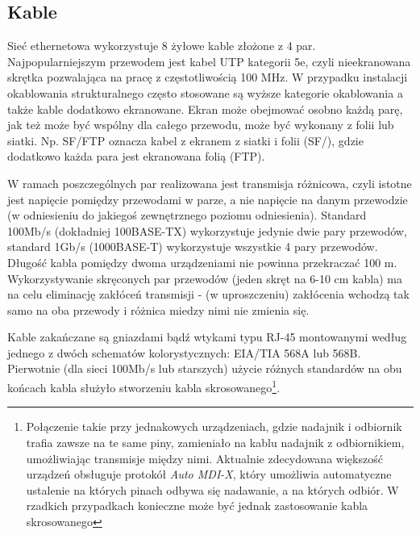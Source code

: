 \documentclass{pdfBooklets}
\begin{document}
\subsection{Kable}

Sieć ethernetowa wykorzystuje 8 żyłowe kable złożone z 4 par. Najpopularniejszym przewodem jest kabel UTP kategorii 5e, czyli nieekranowana skrętka pozwalająca na pracę z częstotliwością 100 MHz. W przypadku instalacji okablowania strukturalnego często stosowane są wyższe kategorie okablowania a także kable dodatkowo ekranowane. Ekran może obejmować osobno każdą parę, jak też może być wspólny dla całego przewodu, może być wykonany z folii lub siatki. Np. SF/FTP oznacza kabel z ekranem z siatki i folii (SF/), gdzie dodatkowo każda para jest ekranowana folią (FTP).

W ramach poszczególnych par realizowana jest transmisja różnicowa, czyli istotne jest napięcie pomiędzy przewodami w parze, a nie napięcie na danym przewodzie (w odniesieniu do jakiegoś zewnętrznego poziomu odniesienia).
Standard 100Mb/s (dokładniej 100BASE-TX) wykorzystuje jedynie dwie pary przewodów, standard 1Gb/s (1000BASE‑T) wykorzystuje wszystkie 4 pary przewodów.
Długość kabla pomiędzy dwoma urządzeniami nie powinna przekraczać 100 m.
Wykorzystywanie skręconych par przewodów (jeden skręt na 6-10 cm kabla) ma na celu eliminację zakłóceń transmisji - (w uproszczeniu) zakłócenia wchodzą tak samo na oba przewody i różnica miedzy nimi nie zmienia się.

Kable zakańczane są gniazdami bądź wtykami typu RJ-45 montowanymi według jednego z dwóch schematów kolorystycznych: EIA/TIA 568A lub 568B.
Pierwotnie (dla sieci 100Mb/s lub starszych) użycie różnych standardów na obu końcach kabla służyło stworzeniu kabla skrosowanego\footnote{Połączenie takie przy jednakowych urządzeniach, gdzie nadajnik i odbiornik trafia zawsze na te same piny, zamieniało na kablu nadajnik z odbiornikiem, umożliwiając transmisje między nimi. Aktualnie zdecydowana większość urządzeń obsługuje protokół \emph{Auto MDI-X}, który umożliwia automatyczne ustalenie na których pinach odbywa się nadawanie, a na których odbiór. W rzadkich przypadkach konieczne może być jednak zastosowanie kabla skrosowanego}.
\end{document}
